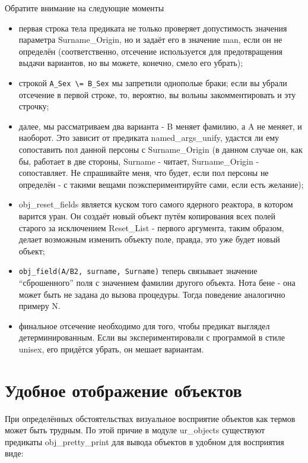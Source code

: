 \documentclass[a4paper]{book}
\begin{document}
Обратите внимание на следующие моменты

\begin{itemize}
\renewcommand{\labelitemi}{$\cdot$}
\item первая строка тела предиката не только проверяет
  допустимость значения параметра Surname_Origin, но и задаёт
  его в значение man, если он не определён (соответственно,
  отсечение используется для предотвращения выдачи вариантов, но
  вы можете, конечно, смело его убрать);
\item строкой \verb|A_Sex \= B_Sex| мы запретили однополые браки;
  если вы убрали отсечение в первой строке, то, вероятно, вы
  вольны закомментировать и эту строчку;
\item далее, мы рассматриваем два варианта - B меняет фамилию, а
  A не меняет, и наоборот. Это зависит от предиката
  named_args_unify, удастся ли ему сопоставить пол данной
  персоны с Surname_Origin (в данном случае он, как бы, работает
  в две стороны, Surname - читает, Surname_Origin -
  сопоставляет. Не спрашивайте меня, что будет, если пол персоны
  не определён - с такими вещами поэкспериментируйте сами, если
  есть желание);
\item obj_reset_fields является куском того самого ядерного
  реактора, в котором варится уран. Он создаёт новый объект путём
  копирования всех полей старого за исключением Reset_List -
  первого аргумента, таким образом, делает возможным изменить
  объекту поле, правда, это уже будет новый объект;
\item \verb|obj_field(A/B2, surname, Surname)| теперь связывает
  значение ``сброшенного'' поля с значением фамилии другого
  объекта. Нота бене - она может быть не задана до вызова
  процедуры. Тогда поведение аналогично примеру N.
\item финальное отсечение необходимо для того, чтобы предикат
  выглядел детерминированным. Если вы экспериментировали с
  программой в стиле unisex, его придётся убрать, он мешает
  вариантам.
\end{itemize}

\section{Удобное отображение объектов}

При определённых обстоятельствах визуальное восприятие объектов
как термов может быть трудным. По этой причие в модуле
ur_objects существуют предикаты obj_pretty_print для вывода
объектов в удобном для восприятия виде:
\end{document}
